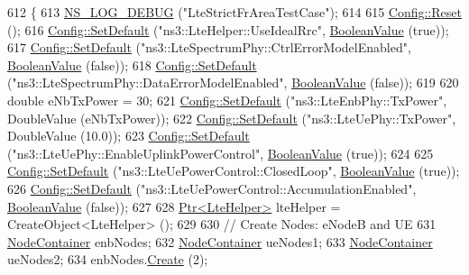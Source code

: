 \begin{DoxyCode}
612 \{
613   \hyperlink{group__logging_ga413f1886406d49f59a6a0a89b77b4d0a}{NS\_LOG\_DEBUG} (\textcolor{stringliteral}{"LteStrictFrAreaTestCase"});
614 
615   \hyperlink{group__config_ga2c1b65724f42f8c72276d7e7ad6df6db}{Config::Reset} ();
616   \hyperlink{group__config_ga2e7882df849d8ba4aaad31c934c40c06}{Config::SetDefault} (\textcolor{stringliteral}{"ns3::LteHelper::UseIdealRrc"}, 
      \hyperlink{classns3_1_1BooleanValue}{BooleanValue} (\textcolor{keyword}{true}));
617   \hyperlink{group__config_ga2e7882df849d8ba4aaad31c934c40c06}{Config::SetDefault} (\textcolor{stringliteral}{"ns3::LteSpectrumPhy::CtrlErrorModelEnabled"}, 
      \hyperlink{classns3_1_1BooleanValue}{BooleanValue} (\textcolor{keyword}{false}));
618   \hyperlink{group__config_ga2e7882df849d8ba4aaad31c934c40c06}{Config::SetDefault} (\textcolor{stringliteral}{"ns3::LteSpectrumPhy::DataErrorModelEnabled"}, 
      \hyperlink{classns3_1_1BooleanValue}{BooleanValue} (\textcolor{keyword}{false}));
619 
620   \textcolor{keywordtype}{double} eNbTxPower = 30;
621   \hyperlink{group__config_ga2e7882df849d8ba4aaad31c934c40c06}{Config::SetDefault} (\textcolor{stringliteral}{"ns3::LteEnbPhy::TxPower"}, DoubleValue (eNbTxPower));
622   \hyperlink{group__config_ga2e7882df849d8ba4aaad31c934c40c06}{Config::SetDefault} (\textcolor{stringliteral}{"ns3::LteUePhy::TxPower"}, DoubleValue (10.0));
623   \hyperlink{group__config_ga2e7882df849d8ba4aaad31c934c40c06}{Config::SetDefault} (\textcolor{stringliteral}{"ns3::LteUePhy::EnableUplinkPowerControl"}, 
      \hyperlink{classns3_1_1BooleanValue}{BooleanValue} (\textcolor{keyword}{true}));
624 
625   \hyperlink{group__config_ga2e7882df849d8ba4aaad31c934c40c06}{Config::SetDefault} (\textcolor{stringliteral}{"ns3::LteUePowerControl::ClosedLoop"}, 
      \hyperlink{classns3_1_1BooleanValue}{BooleanValue} (\textcolor{keyword}{true}));
626   \hyperlink{group__config_ga2e7882df849d8ba4aaad31c934c40c06}{Config::SetDefault} (\textcolor{stringliteral}{"ns3::LteUePowerControl::AccumulationEnabled"}, 
      \hyperlink{classns3_1_1BooleanValue}{BooleanValue} (\textcolor{keyword}{false}));
627 
628   \hyperlink{classns3_1_1Ptr}{Ptr<LteHelper>} lteHelper = CreateObject<LteHelper> ();
629 
630   \textcolor{comment}{// Create Nodes: eNodeB and UE}
631   \hyperlink{classns3_1_1NodeContainer}{NodeContainer} enbNodes;
632   \hyperlink{classns3_1_1NodeContainer}{NodeContainer} ueNodes1;
633   \hyperlink{classns3_1_1NodeContainer}{NodeContainer} ueNodes2;
634   enbNodes.\hyperlink{classns3_1_1NodeContainer_a787f059e2813e8b951cc6914d11dfe69}{Create} (2);

\end{DoxyCode}
